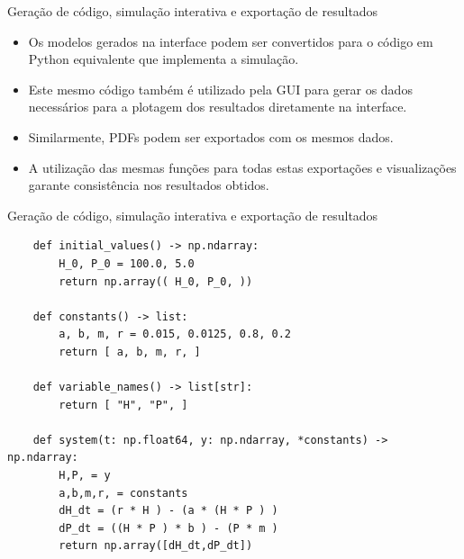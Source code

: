 \begin{frame}{Geração de código, simulação interativa e exportação de resultados}
    \begin{itemize}
        \item Os modelos gerados na interface podem ser convertidos para o código em Python equivalente que implementa a simulação.
        \item Este mesmo código também é utilizado pela GUI para gerar os dados necessários para a plotagem dos resultados diretamente na interface.
        \item Similarmente, PDFs podem ser exportados com os mesmos dados.
        \item A utilização das mesmas funções para todas estas exportações e visualizações garante consistência nos resultados obtidos.
    \end{itemize}
\end{frame}

\begin{frame}[fragile]{Geração de código, simulação interativa e exportação de resultados}
    \begin{verbatim}
    def initial_values() -> np.ndarray:
        H_0, P_0 = 100.0, 5.0
        return np.array(( H_0, P_0, ))

    def constants() -> list:
        a, b, m, r = 0.015, 0.0125, 0.8, 0.2
        return [ a, b, m, r, ]

    def variable_names() -> list[str]:
        return [ "H", "P", ]

    def system(t: np.float64, y: np.ndarray, *constants) -> np.ndarray:
        H,P, = y
        a,b,m,r, = constants
        dH_dt = (r * H ) - (a * (H * P ) ) 
        dP_dt = ((H * P ) * b ) - (P * m ) 
        return np.array([dH_dt,dP_dt])
    \end{verbatim}
\end{frame}


